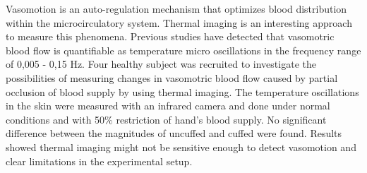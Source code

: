Vasomotion is an auto-regulation mechanism that optimizes blood distribution within the microcirculatory system. Thermal imaging is an interesting approach to measure this phenomena.	
Previous studies have detected that vasomotric blood flow is quantifiable as temperature micro oscillations in the frequency range of 0,005 - 0,15 Hz. Four healthy subject was recruited to investigate the possibilities of measuring changes in vasomotric blood flow caused by partial occlusion of blood supply by using thermal imaging.
The temperature oscillations in the skin were measured with an infrared camera and done under normal conditions and with 50\% restriction of hand$’$s blood supply.
No significant difference between the magnitudes of uncuffed and cuffed were found. 
Results showed thermal imaging might not be sensitive enough to detect vasomotion and clear limitations in the experimental setup.